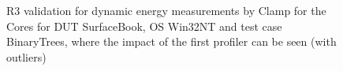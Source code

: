\begin{figure}
                            \caption{R3 validation for dynamic energy measurements by Clamp for the Cores for DUT SurfaceBook, OS Win32NT and test case BinaryTrees, where the impact of the first profiler can be seen (with outliers)} \label{fig:SurfaceBook_Clamp_Cores_R3_dynamic_energy_with_outliers_Win32NT_avg_watts}
                            \end{figure}
                            